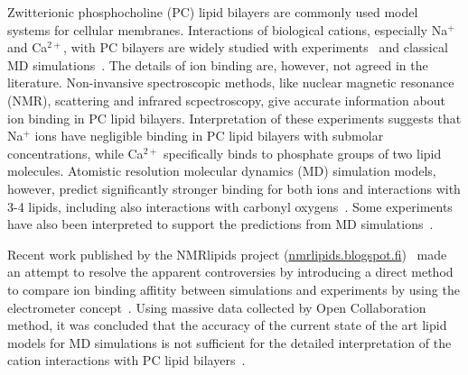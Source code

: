 \documentclass[aip,jcp,twocolumn]{revtex4}
\begin{document}
Zwitterionic phosphocholine (PC) lipid bilayers are commonly used model systems for
cellular membranes. Interactions of biological cations, especially Na$^+$ and
Ca$^{2+}$, with PC bilayers are widely studied with
experiments~\cite{akutsu81,altenbach84,seelig90,cevc90,tocanne90,binder02,pabst07,uhrikova08}
and classical MD simulations~\cite{bockmann03,bockmann04,Berkowitz12,melcrova16,javanainen17}.
The details of ion binding are, however, not agreed in the literature.
Non-invansive spectroscopic methods, like nuclear magnetic resonance (NMR), scattering
and infrared scpectroscopy, give accurate information about ion binding
in PC lipid bilayers\cite{hauser76,hauser78,herbette84,akutsu81,altenbach84,binder02,pabst07,uhrikova08}.
Interpretation of these experiments suggests that Na$^+$ ions have
negligible binding in PC lipid bilayers with submolar concentrations, while Ca$^{2+}$ specifically
binds to phosphate groups of two lipid molecules. Atomistic resolution
molecular dynamics (MD) simulation models, however, predict significantly
stronger binding for both ions and interactions with 3-4 lipids,
including also interactions with carbonyl
oxygens~\cite{bockmann03,bockmann04,melcrova16,javanainen17}.
Some experiments have also been interpreted to support the predictions from
MD simulations~\cite{bockmann03,vacha09a}. 

Recent work published by the NMRlipids project (\url{nmrlipids.blogspot.fi})~\cite{catte16}
made an attempt to resolve the apparent controversies by introducing a direct
method to compare ion binding affitity between simulations and
experiments by using the electrometer concept~\cite{seelig87}.
Using massive data collected by Open Collaboration method, it was concluded
that the accuracy of the current state of the art lipid models for MD
simulations is not sufficient for the detailed interpretation of the cation
interactions with PC lipid bilayers~\cite{catte16}.

\end{document}
